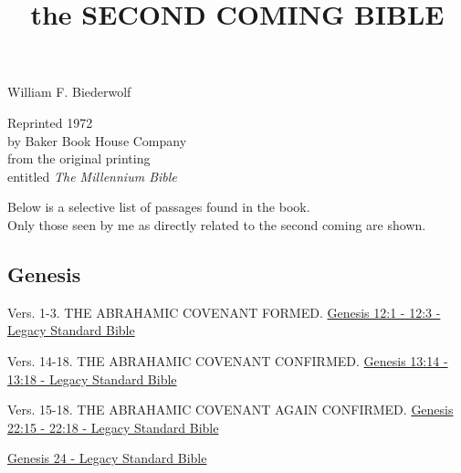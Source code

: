 \documentclass[
  ignorenonframetext,
]{beamer}
\title{the SECOND COMING BIBLE}
\author{}
\date{}
\begin{document}
\frame{\titlepage}

\begin{frame}
William F. Biederwolf

Reprinted 1972\\
by Baker Book House Company\\
from the original printing\\
entitled \emph{The Millennium Bible}

Below is a selective list of passages found in the book.\\
Only those seen by me as directly related to the second coming are
shown.
\end{frame}

\subsection{Genesis}\label{genesis}

\begin{frame}{12}
\label{section}
\begin{block}{Vers. 1-3. THE ABRAHAMIC COVENANT FORMED.}
\label{vers.-1-3.-the-abrahamic-covenant-formed.}
\href{https://read.lsbible.org/?q=gen12\%3A1-3}{Genesis 12:1 - 12:3 -
Legacy Standard Bible}
\end{block}
\end{frame}

\begin{frame}{13}
\label{section-1}
\begin{block}{Vers. 14-18. THE ABRAHAMIC COVENANT CONFIRMED.}
\label{vers.-14-18.-the-abrahamic-covenant-confirmed.}
\href{https://read.lsbible.org/?q=gen13\%3A14-18}{Genesis 13:14 - 13:18
- Legacy Standard Bible}
\end{block}
\end{frame}

\begin{frame}{22}
\label{section-2}
\begin{block}{Vers. 15-18. THE ABRAHAMIC COVENANT AGAIN CONFIRMED.}
\label{vers.-15-18.-the-abrahamic-covenant-again-confirmed.}
\href{https://read.lsbible.org/?q=gen22\%3A15-18}{Genesis 22:15 - 22:18
- Legacy Standard Bible}
\end{block}
\end{frame}

\begin{frame}{24}
\label{section-3}
\href{https://read.lsbible.org/?q=gen24}{Genesis 24 - Legacy Standard
Bible}
\end{frame}
\end{document}
